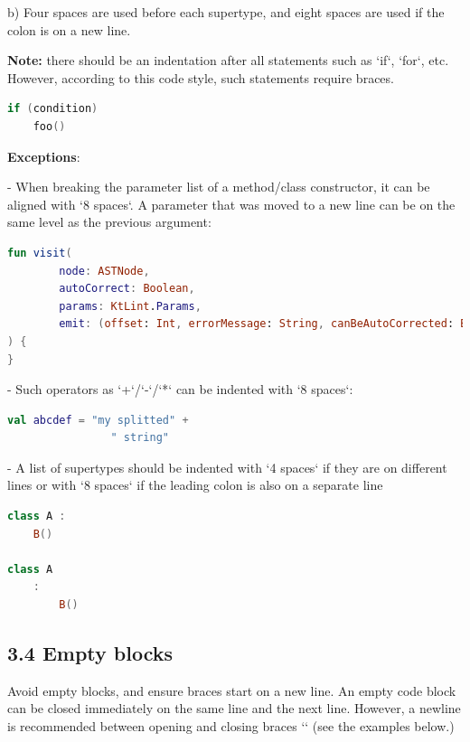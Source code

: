 b) Four spaces are used before each supertype, and eight spaces are used if the colon is on a new line. 



\textbf{Note:} there should be an indentation after all statements such as `if`, `for`, etc. However, according to this code style, such statements require braces. 



\begin{lstlisting}[language=Kotlin]
if (condition)
    foo()
\end{lstlisting}


\textbf{Exceptions}: 

- When breaking the parameter list of a method/class constructor, it can be aligned with `8 spaces`. A parameter that was moved to a new line can be on the same level as the previous argument:

    

\begin{lstlisting}[language=Kotlin]
fun visit(
        node: ASTNode,
        autoCorrect: Boolean,
        params: KtLint.Params,
        emit: (offset: Int, errorMessage: String, canBeAutoCorrected: Boolean) -> Unit
) {   
}
\end{lstlisting}
    

- Such operators as `+`/`-`/`*` can be indented with `8 spaces`:

    

\begin{lstlisting}[language=Kotlin]
val abcdef = "my splitted" +
                " string"
\end{lstlisting}
    

- A list of supertypes should be indented with `4 spaces` if they are on different lines or with `8 spaces` if the leading colon is also on a separate line



\begin{lstlisting}[language=Kotlin]
class A :
    B()
    
class A
    :
        B()
\end{lstlisting}


\subsection*{\textbf{3.4 Empty blocks}}

\label{sec:3.4}



Avoid empty blocks, and ensure braces start on a new line. An empty code block can be closed immediately on the same line and the next line. However, a newline is recommended between opening and closing braces `{}` (see the examples below.)



